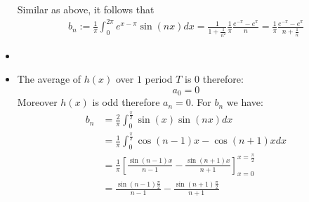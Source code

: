 \documentclass[11pt]{article}
\begin{document}
\begin{solution}
\begin{itemize}
        Similar as above, it follows that 
        \begin{align*}
            b_n:= \frac{1}{\pi}
                    \int_{0}^{2\pi} e^{x - \pi} \sin(n x) dx = \frac{1}{1 + \frac{1}{n^2}} \frac{1}{\pi}\frac{e^{-\pi} - e^{\pi}}{n} = \frac{1}{\pi}  \frac{e^{-\pi} - e^{\pi}}{n + \frac{1}{n}}
        \end{align*}
    \item
    \item 
    The average of $h(x)$ over $1$ period $T$ is $0$ therefore:
    \[
        a_0 = 0
    \]
    Moreover $h(x)$ is odd therefore $a_n = 0$. For $b_n$ we have:
    \begin{align*}
        b_n 
        &
        = 
        \frac{2}{\pi}
        \int_{0}^{\frac{\pi}{2}} \sin(x) \sin(n x) dx
        \\&
        =
        \frac{1}{\pi}
        \int_{0}^{\frac{\pi}{2}} \cos(n-1)x - \cos(n+1)x dx
        \\&
        =
        \frac{1}{\pi}
        \left[ \frac{\sin(n-1)x}{n-1} - \frac{\sin(n+1)x}{n+1}\right]_{x=0}^{x=\frac{\pi}{2}}
        \\&
        =
        \frac{\sin(n-1)\frac{\pi}{2}}{n-1} - \frac{\sin(n+1)\frac{\pi}{2}}{n+1}
    \end{align*}
\end{itemize}
\end{solution}
\end{document}
